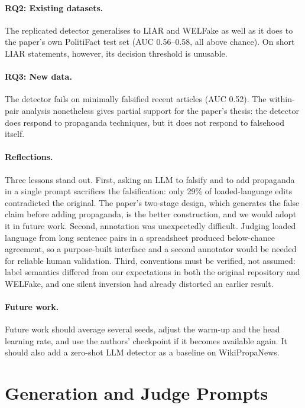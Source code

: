 \documentclass[11pt]{article}
\begin{document}
\paragraph{RQ2: Existing datasets.} The replicated detector generalises to LIAR and WELFake as well as it does to the paper's own PolitiFact test set (AUC 0.56--0.58, all above chance). On short LIAR statements, however, its decision threshold is unusable.

\paragraph{RQ3: New data.} The detector fails on minimally falsified recent articles (AUC 0.52). The within-pair analysis nonetheless gives partial support for the paper's thesis: the detector does respond to propaganda techniques, but it does not respond to falsehood itself.

\paragraph{Reflections.} Three lessons stand out. First, asking an LLM to falsify and to add propaganda in a single prompt sacrifices the falsification: only 29\% of loaded-language edits contradicted the original. The paper's two-stage design, which generates the false claim before adding propaganda, is the better construction, and we would adopt it in future work. Second, annotation was unexpectedly difficult. Judging loaded language from long sentence pairs in a spreadsheet produced below-chance agreement, so a purpose-built interface and a second annotator would be needed for reliable human validation. Third, conventions must be verified, not assumed: label semantics differed from our expectations in both the original repository and WELFake, and one silent inversion had already distorted an earlier result.

\paragraph{Future work.} Future work should average several seeds, adjust the warm-up and the head learning rate, and use the authors' checkpoint if it becomes available again. It should also add a zero-shot LLM detector as a baseline on WikiPropaNews.



\appendix

\section{Generation and Judge Prompts}
\label{app:prompts}
\end{document}
